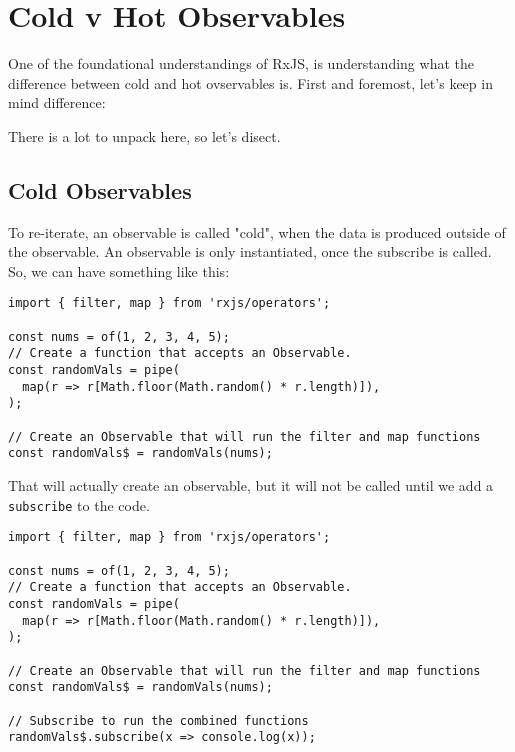 \chapter{Cold v Hot Observables}
One of the foundational understandings of RxJS, is understanding what the 
difference between cold and hot ovservables is. First and foremost, let's 
keep in mind difference:
\begin{quote}
\end{quote}

There is a lot to unpack here, so let's disect. 

\section{Cold Observables}
To re-iterate, an observable is called "cold", when the data is produced outside of the observable. An observable is only instantiated, once the
subscribe is called. So, we can have something like this: 

\begin{lstlisting}[caption=observable without subscribe]
import { filter, map } from 'rxjs/operators';

const nums = of(1, 2, 3, 4, 5);
// Create a function that accepts an Observable.
const randomVals = pipe( 
  map(r => r[Math.floor(Math.random() * r.length)]),
);

// Create an Observable that will run the filter and map functions
const randomVals$ = randomVals(nums);
\end{lstlisting}

That will actually create an observable, but it will not be called until we add a \lstinline{subscribe} to the code. 

\begin{lstlisting}[caption=observable with subscribe]
import { filter, map } from 'rxjs/operators';

const nums = of(1, 2, 3, 4, 5);
// Create a function that accepts an Observable.
const randomVals = pipe( 
  map(r => r[Math.floor(Math.random() * r.length)]),
);

// Create an Observable that will run the filter and map functions
const randomVals$ = randomVals(nums);

// Subscribe to run the combined functions
randomVals$.subscribe(x => console.log(x));
\end{lstlisting}


